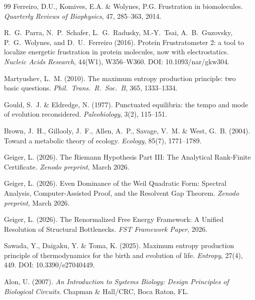 \documentclass[12pt,a4paper]{article}
\theoremstyle{remark}
\begin{document}
\begin{thebibliography}{99}
Ferreiro, D.U., Komives, E.A. \& Wolynes, P.G.
\newblock Frustration in biomolecules.
\newblock \textit{Quarterly Reviews of Biophysics}, 47, 285--363, 2014.

R.~G.~Parra, N.~P.~Schafer, L.~G.~Radusky, M.-Y.~Tsai, A.~B.~Guzovsky, P.~G.~Wolynes, and D.~U.~Ferreiro (2016).
\newblock Protein Frustratometer 2: a tool to localize energetic frustration in protein molecules, now with electrostatics.
\newblock \textit{Nucleic Acids Research}, 44(W1), W356--W360.
\newblock DOI: 10.1093/nar/gkw304.

Martyushev, L.~M. (2010).
\newblock The maximum entropy production principle: two basic questions.
\newblock \textit{Phil.\ Trans.\ R.\ Soc.\ B}, 365, 1333--1334.

Gould, S.~J. \& Eldredge, N. (1977).
\newblock Punctuated equilibria: the tempo and mode of evolution reconsidered.
\newblock \textit{Paleobiology}, 3(2), 115--151.

Brown, J.~H., Gillooly, J.~F., Allen, A.~P., Savage, V.~M. \& West, G.~B. (2004).
\newblock Toward a metabolic theory of ecology.
\newblock \textit{Ecology}, 85(7), 1771--1789.

Geiger, L. (2026).
\newblock The Riemann Hypothesis Part III: The Analytical Rank-Finite Certificate.
\newblock \textit{Zenodo preprint}, March 2026.

Geiger, L. (2026).
\newblock Even Dominance of the Weil Quadratic Form: Spectral Analysis, Computer-Assisted Proof, and the Resolvent Gap Theorem.
\newblock \textit{Zenodo preprint}, March 2026.

Geiger, L. (2026).
\newblock The Renormalized Free Energy Framework: A Unified Resolution of Structural Bottlenecks.
\newblock \textit{FST Framework Paper}, 2026.

Sawada, Y., Daigaku, Y. \& Toma, K. (2025).
\newblock Maximum entropy production principle of thermodynamics for the birth and evolution of life.
\newblock \textit{Entropy}, 27(4), 449.
\newblock DOI: 10.3390/e27040449.

Alon, U. (2007).
\newblock \textit{An Introduction to Systems Biology: Design Principles of Biological Circuits}.
\newblock Chapman \& Hall/CRC, Boca Raton, FL.


\end{thebibliography}
\end{document}
